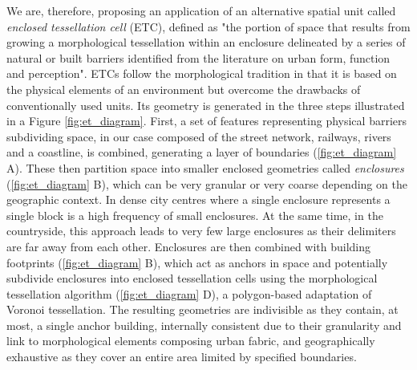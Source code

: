 \documentclass[fleqn,10pt]{wlscirep}
\begin{document}
We are, therefore, proposing an application of an alternative spatial unit called \textit{enclosed
tessellation cell} (ETC), defined as "the portion of space that results
from growing a morphological tessellation within an enclosure delineated by a series
of natural or built barriers identified from the literature on urban form, function and
perception"\cite{dab_mf_2021a}.
ETCs follow the morphological tradition in that it is
based on the physical elements of an environment but overcome the drawbacks of
conventionally used units. Its geometry is generated in the three steps illustrated in a
Figure \ref{fig:et_diagram}. First, a set of features representing physical barriers
subdividing space, in our case composed of the street network, railways, rivers and a
coastline, is combined, generating a layer of boundaries (\ref{fig:et_diagram} A).
These then partition space
into smaller enclosed geometries called \textit{enclosures} (\ref{fig:et_diagram} B),
which can be very granular
or very coarse depending on the geographic context. In dense city centres where a single
enclosure represents a single block is a high frequency of small enclosures. At the same time, in the
countryside, this approach leads to very few large enclosures as their delimiters are far away
from each other. Enclosures are then combined with building footprints (\ref{fig:et_diagram} B),
which act as
anchors in space and potentially subdivide enclosures into enclosed tessellation cells using the
morphological tessellation algorithm\cite{fleischmann2020} (\ref{fig:et_diagram} D),
a polygon-based adaptation of Voronoi
tessellation. The resulting geometries are indivisible as they contain, at most, a single
anchor building, internally consistent due to their granularity and link to morphological
elements composing urban fabric, and geographically exhaustive as they cover an entire area
limited by specified boundaries.

\end{document}
